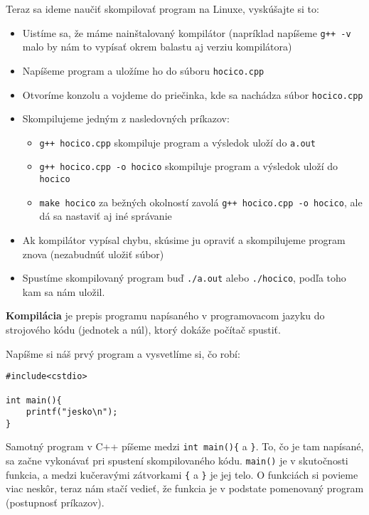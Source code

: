 Teraz sa ideme naučiť skompilovať program na Linuxe, vyskúšajte si to:
\begin{itemize}
    \item Uistíme sa, že máme nainštalovaný kompilátor 
    (napríklad napíšeme \verb!g++ -v! malo by nám to 
    vypísať okrem balastu aj verziu kompilátora)
    \item Napíšeme program a uložíme ho do súboru \verb!hocico.cpp!
    \item Otvoríme konzolu a vojdeme do priečinka, 
    kde sa nachádza súbor \verb!hocico.cpp!
    \item Skompilujeme jedným z nasledovných príkazov:
    \begin{itemize}
        \item \verb!g++ hocico.cpp! skompiluje program 
        a výsledok uloží do \verb!a.out!
        \item \verb!g++ hocico.cpp -o hocico! skompiluje program 
        a výsledok uloží do \verb!hocico!
        \item \verb!make hocico! za bežných okolností zavolá 
        \verb!g++ hocico.cpp -o hocico!, ale dá sa nastaviť aj iné správanie
    \end{itemize}
    \item Ak kompilátor vypísal chybu, skúsime ju opraviť a skompilujeme
    program znova (nezabudnúť uložiť súbor) 
    \item Spustíme skompilovaný program
    buď \verb!./a.out! alebo \verb!./hocico!, podľa toho kam sa nám uložil.
    
\end{itemize}


\textbf{Kompilácia} je prepis programu napísaného v programovacom jazyku do
strojového kódu (jednotek a núl), ktorý dokáže počítač spustiť.


Napíšme si náš prvý program a vysvetlíme si, čo robí:
\begin{lstlisting}
#include<cstdio>

int main(){
    printf("jesko\n");
}
\end{lstlisting}

Samotný program v C++ píšeme medzi \verb!int main(){! a \verb!}!.  To, čo je
tam napísané, sa začne vykonávať pri spustení skompilovaného kódu.
\verb!main()! je v skutočnosti funkcia, a medzi kučeravými zátvorkami \verb'{'
a \verb'}' je jej telo.  O funkciách si povieme viac neskôr, teraz nám stačí
vedieť, že funkcia je v podstate pomenovaný program (postupnosť príkazov). 

